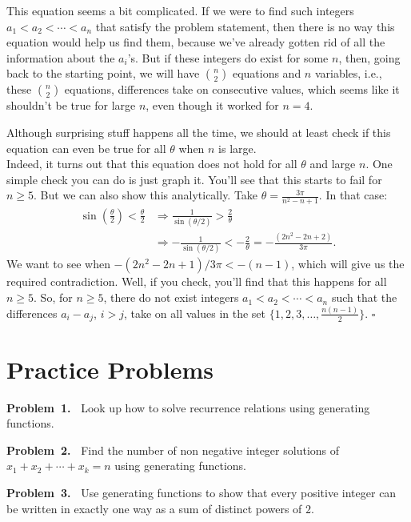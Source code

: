 \documentclass[11pt]{scrartcl}
\theoremstyle{plain}
\theoremstyle{definition}
\theoremstyle{remark}
\newcounter{problem}
\newcounter{solution}
\newcommand{\numproblem}[2]{%
    \noindent\textbf{Problem~#1.~}#2%
    \vspace{0.3cm}\par%
}
\begin{document}
\noindent This equation seems a bit complicated. If we were to find such integers $a_1 < a_2 < \cdots < a_n$ that satisfy the problem statement, then there is no way this equation would help us find them, because we've already gotten rid of all the information about the $a_i$'s. But if these integers do exist for some $n$, then, going back to the starting point, we will have $\binom{n}{2}$ equations and $n$ variables, i.e., these $\binom{n}{2}$ equations, differences take on consecutive values, which seems like it shouldn't be true for large $n$, even though it worked for $n = 4$.

\noindent Although surprising stuff happens all the time, we should at least check if this equation can even be true for all $\theta$ when $n$ is large.\\

\noindent Indeed, it turns out that this equation does not hold for all $\theta$ and large $n$. One simple check you can do is just graph it. You'll see that this starts to fail for $n \geq 5$. But we can also show this analytically. Take $\theta = \frac{3\pi}{n^2-n+1}$. In that case:
\begin{align*}
    \sin\left(\frac{\theta}{2}\right) < \frac{\theta}{2} &\Rightarrow \frac{1}{\sin(\theta/2)} > \frac{2}{\theta}\\
    &\Rightarrow -\frac{1}{\sin(\theta/2)} < -\frac{2}{\theta} = -\frac{(2n^2-2n+2)}{3\pi}.
\end{align*}
We want to see when $-(2n^2-2n+1)/3\pi < -(n-1)$, which will give us the required contradiction. Well, if you check, you'll find that this happens for all $n \geq 5$. So, for $n \geq 5$, there do not exist integers $a_1 < a_2 < \cdots < a_n$ such that the differences $a_i - a_j$, $i > j$, take on all values in the set $\{1, 2, 3, \ldots, \frac{n(n-1)}{2}\}$. $\square$

\bigskip

\section{Practice Problems}

\numproblem{1}{
    Look up how to solve recurrence relations using generating functions.
}

\numproblem{2}{
    Find the number of non negative integer solutions of $x_1 + x_2 + \cdots + x_k = n$ using generating functions.
}

\numproblem{3}{
    Use generating functions to show that every positive integer can be written in exactly one way as a sum of distinct powers of $2$.
}
\end{document}
